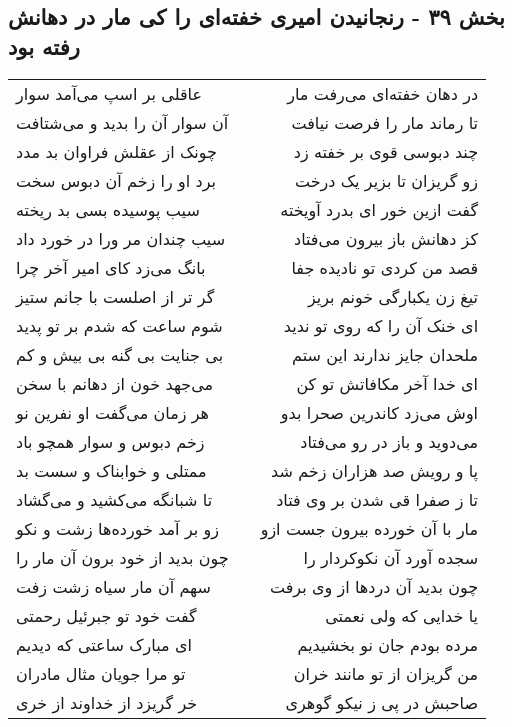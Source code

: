 \begin{center}
\section*{بخش ۳۹ - رنجانیدن امیری خفته‌ای را کی مار در دهانش رفته بود}
\label{sec:sh039}
\begin{longtable}{l p{0.5cm} r}
عاقلی بر اسپ می‌آمد سوار
&&
در دهان خفته‌ای می‌رفت مار
\\
آن سوار آن را بدید و می‌شتافت
&&
تا رماند مار را فرصت نیافت
\\
چونک از عقلش فراوان بد مدد
&&
چند دبوسی قوی بر خفته زد
\\
برد او را زخم آن دبوس سخت
&&
زو گریزان تا بزیر یک درخت
\\
سیب پوسیده بسی بد ریخته
&&
گفت ازین خور ای بدرد آویخته
\\
سیب چندان مر ورا در خورد داد
&&
کز دهانش باز بیرون می‌فتاد
\\
بانگ می‌زد کای امیر آخر چرا
&&
قصد من کردی تو نادیده جفا
\\
گر تر از اصلست با جانم ستیز
&&
تیغ زن یکبارگی خونم بریز
\\
شوم ساعت که شدم بر تو پدید
&&
ای خنک آن را که روی تو ندید
\\
بی جنایت بی گنه بی بیش و کم
&&
ملحدان جایز ندارند این ستم
\\
می‌جهد خون از دهانم با سخن
&&
ای خدا آخر مکافاتش تو کن
\\
هر زمان می‌گفت او نفرین نو
&&
اوش می‌زد کاندرین صحرا بدو
\\
زخم دبوس و سوار همچو باد
&&
می‌دوید و باز در رو می‌فتاد
\\
ممتلی و خوابناک و سست بد
&&
پا و رویش صد هزاران زخم شد
\\
تا شبانگه می‌کشید و می‌گشاد
&&
تا ز صفرا قی شدن بر وی فتاد
\\
زو بر آمد خورده‌ها زشت و نکو
&&
مار با آن خورده بیرون جست ازو
\\
چون بدید از خود برون آن مار را
&&
سجده آورد آن نکوکردار را
\\
سهم آن مار سیاه زشت زفت
&&
چون بدید آن دردها از وی برفت
\\
گفت خود تو جبرئیل رحمتی
&&
یا خدایی که ولی نعمتی
\\
ای مبارک ساعتی که دیدیم
&&
مرده بودم جان نو بخشیدیم
\\
تو مرا جویان مثال مادران
&&
من گریزان از تو مانند خران
\\
خر گریزد از خداوند از خری
&&
صاحبش در پی ز نیکو گوهری
\\

\end{longtable}
\end{center}

